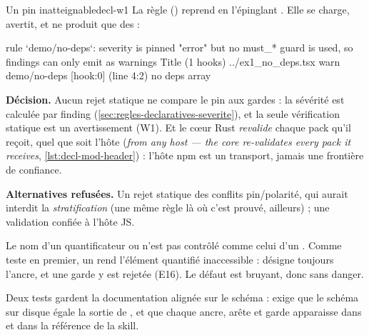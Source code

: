 \begin{exemple}{Un pin inatteignable}{decl-w1}
La règle  () reprend  en l'épinglant . Elle se charge, avertit, et ne produit que des \Warning{} :
\begin{sortie}
[warn] rule `demo/no-deps`: severity is pinned "error" but no must_* guard is used, so findings can only emit as warnings
  Title  (1 hooks)  ../ex1_no_deps.tsx
    warn   demo/no-deps  [hook:0]  (line 4:2)  no deps array
\end{sortie}
\end{exemple}

\begin{decision}
\textbf{Décision.} Aucun rejet statique ne compare le pin aux gardes : la sévérité est calculée par finding (\cref{sec:regles-declaratives-severite}), et la seule vérification statique est un avertissement (W1). Et le cœur Rust \emph{revalide} chaque pack qu'il reçoit, quel que soit l'hôte (\og \emph{from any host --- the core re-validates every pack it receives}\fg{}, \cref{lst:decl-mod-header}) : l'hôte npm est un transport, jamais une frontière de confiance.

\textbf{Alternatives refusées.} Un rejet statique des conflits pin/polarité, qui aurait interdit la \emph{stratification} (une même règle \Error{} là où c'est prouvé, \Warning{} ailleurs) ; une validation confiée à l'hôte JS.
\end{decision}

\begin{piege}
Le nom  d'un quantificateur  ou  n'est pas contrôlé comme celui d'un . Comme  teste  en premier, un  rend l'élément quantifié inaccessible :  désigne toujours l'ancre, et une garde  y est rejetée (E16). Le défaut est bruyant, donc sans danger.
\end{piege}

Deux tests gardent la documentation alignée sur le schéma :  exige que le schéma sur disque égale la sortie de , et  que chaque ancre, arête et garde apparaisse dans  et dans la référence de la skill.

